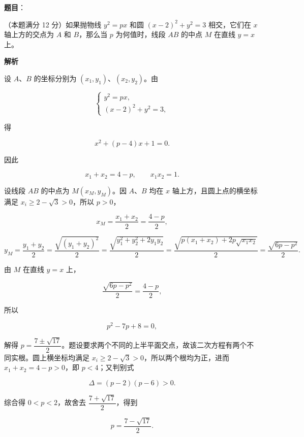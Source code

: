 \begin{answer}

\textbf{题目}：

（本题满分 12 分）如果抛物线 $y^2=px$ 和圆 $(x-2)^2+y^2=3$ 相交，它们在 $x$ 轴上方的交点为 $A$ 和 $B$，那么当 $p$ 为何值时，线段 $AB$ 的中点 $M$ 在直线 $y=x$ 上。
\nopagebreak[4]
\begin{center}\end{center}
\nopagebreak[4]
\textbf{解析}

设 $A\text{、}B$ 的坐标分别为 $(x_1,y_1)$、$(x_2,y_2)$。由

\nopagebreak[4]
\[
\begin{cases}
y^2=px,\\
(x-2)^2+y^2=3,
\end{cases}
\]

得

\nopagebreak[4]
\[
x^2+(p-4)x+1=0.
\]

因此

\nopagebreak[4]
\[
x_1+x_2=4-p,\qquad x_1x_2=1.
\]

设线段 $AB$ 的中点为 $M(x_M,y_M)$。因 $A\text{、}B$ 均在 $x$ 轴上方，且圆上点的横坐标满足 $x_i\ge2-\sqrt3>0$，所以 $p>0$，

\nopagebreak[4]
\[
x_M=\frac{x_1+x_2}{2}=\frac{4-p}{2},
\]

\nopagebreak[4]
\[
y_M=\frac{y_1+y_2}{2}
=\frac{\sqrt{(y_1+y_2)^2}}2
=\frac{\sqrt{y_1^2+y_2^2+2y_1y_2}}2
=\frac{\sqrt{p(x_1+x_2)+2p\sqrt{x_1x_2}}}{2}
=\frac{\sqrt{6p-p^2}}2.
\]

由 $M$ 在直线 $y=x$ 上，

\nopagebreak[4]
\[
\frac{\sqrt{6p-p^2}}2=\frac{4-p}{2},
\]

所以

\nopagebreak[4]
\[
p^2-7p+8=0,
\]

解得 $p=\dfrac{7\pm\sqrt{17}}2$。题设要求两个不同的上半平面交点，故该二次方程有两个不同实根。圆上横坐标均满足 $x_i\ge2-\sqrt3>0$，所以两个根均为正，进而 $x_1+x_2=4-p>0$，即 $p<4$；又判别式

\nopagebreak[4]
\[
\Delta=(p-2)(p-6)>0.
\]

综合得 $0<p<2$，故舍去 $\dfrac{7+\sqrt{17}}2$，得到

\nopagebreak[4]
\[
p=\frac{7-\sqrt{17}}2.
\]


\end{answer}